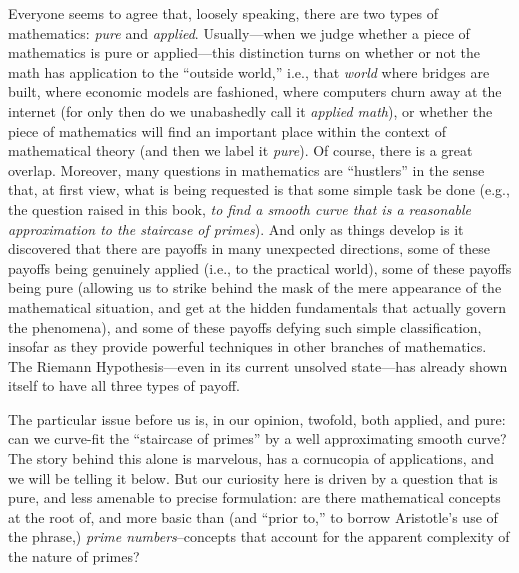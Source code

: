 \documentclass[11pt]{article}
\theoremstyle{plain}
\theoremstyle{definition}
\numberwithin{equation}{section}
\numberwithin{figure}{section}
\numberwithin{table}{section}
\begin{document}
Everyone seems to agree that, loosely speaking, there are two types of
mathematics: {\em pure} and {\em applied}. Usually---when we judge
whether a piece of mathematics is pure or applied---this distinction
turns on whether or not the math has application to the ``outside
world,'' i.e., that {\em world} where bridges are built, where economic
models are fashioned, where computers churn away at the internet (for
only then do we unabashedly call it {\em applied math}), or whether
the piece of mathematics will find an important place within the
context of mathematical theory (and then we label it {\em pure}).  Of
course, there is a great overlap. Moreover, many questions in
mathematics are ``hustlers'' in the sense that, at first view, what is
being requested is that some simple task be done (e.g., the question
raised in this book, {\em to find a smooth curve that is a reasonable
  approximation to the staircase of primes}).  And only as things
develop is it discovered that there are payoffs in many unexpected
directions, some of these payoffs being genuinely applied (i.e., to
the practical world), some of these payoffs being pure (allowing us
to strike behind the mask of the mere appearance of the mathematical
situation, and get at the hidden fundamentals that actually govern the
phenomena), and some of these payoffs defying such simple
classification, insofar as they provide powerful techniques in other
branches of mathematics.  The Riemann Hypothesis---even in its current
unsolved state---has already shown itself to have all three types of
payoff.

The particular issue before us is, in our opinion, twofold, both
applied, and pure: can we curve-fit the ``staircase of primes'' by a
well approximating smooth curve?  The story behind this alone is
marvelous, has a cornucopia of applications, and we will be telling it
below. But our curiosity here is driven by a question that is pure,
and less amenable to precise formulation: are there mathematical
concepts at the root of, and more basic than (and ``prior to,'' to
borrow Aristotle's use of the phrase,) {\em prime numbers}--concepts
that account for the apparent complexity of the nature of primes?
   
   
   
\end{document}
